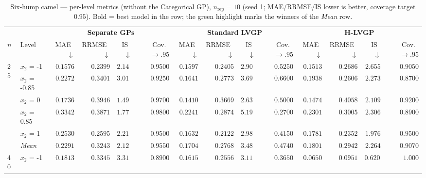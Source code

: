 \begin{table}[htbp]
\centering
\scriptsize
\setlength{\tabcolsep}{2.5pt}
\setlength{\fboxsep}{1pt}
\caption{Six-hump camel --- per-level metrics (without the Categorical GP), $n_{\mathrm{rep}}=10$ (seed 1; MAE/RRMSE/IS lower is better, coverage target $0.95$). Bold = best model in the row; the green highlight marks the winners of the \emph{Mean} row.}
\label{tab:sixhump_camel_nrep10_nocat}
\begin{tabular}{llrrrrrrrrrrrr}
\toprule
 & & \multicolumn{4}{c}{\textbf{Separate GPs}} & \multicolumn{4}{c}{\textbf{Standard LVGP}} & \multicolumn{4}{c}{\textbf{H-LVGP}} \\
\cmidrule(lr){3-6} \cmidrule(lr){7-10} \cmidrule(lr){11-14}
$n$ & Level & MAE~$\downarrow$ & RRMSE~$\downarrow$ & IS~$\downarrow$ & Cov.~$\to.95$ & MAE~$\downarrow$ & RRMSE~$\downarrow$ & IS~$\downarrow$ & Cov.~$\to.95$ & MAE~$\downarrow$ & RRMSE~$\downarrow$ & IS~$\downarrow$ & Cov.~$\to.95$ \\
\midrule
\multirow{6}{*}{25} & $x_2$ = -1 & $0.1576$ & {\boldmath$0.2399$} & {\boldmath$2.147$} & {\boldmath$0.9500$} & $0.1597$ & $0.2405$ & $2.904$ & $0.5250$ & {\boldmath$0.1513$} & $0.2686$ & $2.655$ & $0.9050$ \\
 & $x_2$ = -0.85 & $0.2272$ & $0.3401$ & $3.011$ & {\boldmath$0.9250$} & {\boldmath$0.1641$} & $0.2773$ & $3.695$ & $0.6600$ & $0.1938$ & {\boldmath$0.2606$} & {\boldmath$2.273$} & $0.8700$ \\
 & $x_2$ = 0 & $0.1736$ & $0.3946$ & {\boldmath$1.491$} & {\boldmath$0.9700$} & {\boldmath$0.1410$} & {\boldmath$0.3669$} & $2.630$ & $0.5000$ & $0.1474$ & $0.4058$ & $2.109$ & $0.9200$ \\
 & $x_2$ = 0.85 & $0.3342$ & $0.3871$ & {\boldmath$1.770$} & {\boldmath$0.9800$} & {\boldmath$0.2241$} & {\boldmath$0.2874$} & $5.190$ & $0.2700$ & $0.2301$ & $0.3005$ & $2.306$ & $0.8900$ \\
 & $x_2$ = 1 & $0.2530$ & $0.2595$ & $2.216$ & {\boldmath$0.9500$} & {\boldmath$0.1632$} & {\boldmath$0.2122$} & $2.988$ & $0.4150$ & $0.1781$ & $0.2352$ & {\boldmath$1.976$} & $0.9500$ \\
 & \textit{Mean} & $0.2291$ & $0.3243$ & \colorbox{green!20}{\boldmath$2.127$} & \colorbox{green!20}{\boldmath$0.9550$} & \colorbox{green!20}{\boldmath$0.1704$} & \colorbox{green!20}{\boldmath$0.2768$} & $3.481$ & $0.4740$ & $0.1801$ & $0.2942$ & $2.264$ & $0.9070$ \\
\midrule
\multirow{6}{*}{40} & $x_2$ = -1 & $0.1813$ & $0.3345$ & $3.313$ & $0.8900$ & $0.1615$ & $0.2556$ & $3.114$ & $0.3650$ & {\boldmath$0.0650$} & {\boldmath$0.0951$} & {\boldmath$0.6201$} & {\boldmath$1.000$} \\

\end{tabular}
\end{table}
